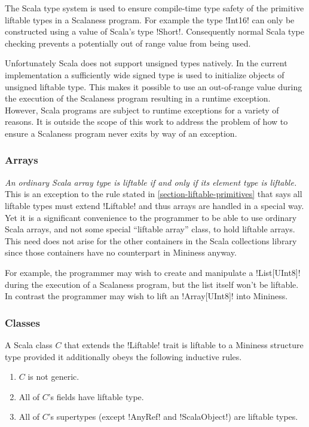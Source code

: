 The Scala type system is used to ensure compile-time type safety of the primitive liftable types
in a Scalaness program. For example the type !Int16! can only be constructed using a value of
Scala's type !Short!. Consequently normal Scala type checking prevents a potentially out of
range value from being used.

Unfortunately Scala does not support unsigned types natively. In the current implementation a
sufficiently wide signed type is used to initialize objects of unsigned liftable type. This
makes it possible to use an out-of-range value during the execution of the Scalaness program
resulting in a runtime exception. However, Scala programs are subject to runtime exceptions for
a variety of reasons. It is outside the scope of this work to address the problem of how to
ensure a Scalaness program never exits by way of an exception.

\subsubsection{Arrays}
\label{section-liftable-arrays}

\emph{An ordinary Scala array type is liftable if and only if its element type is liftable.}
This is an exception to the rule stated in \autoref{section-liftable-primitives} that says all
liftable types must extend !Liftable! and thus arrays are handled in a special way. Yet it is a
significant convenience to the programmer to be able to use ordinary Scala arrays, and not some
special ``liftable array'' class, to hold liftable arrays. This need does not arise for the
other containers in the Scala collections library since those containers have no counterpart in
Mininess anyway.

For example, the programmer may wish to create and manipulate a !List[UInt8]! during the
execution of a Scalaness program, but the list itself won't be liftable. In contrast the
programmer may wish to lift an !Array[UInt8]! into Mininess.

\subsubsection{Classes}
\label{section-liftable-classes}

A Scala class $C$ that extends the !Liftable! trait is liftable to a Mininess structure type
provided it additionally obeys the following inductive rules.

\begin{enumerate}
\item $C$ is not generic.
\item All of $C$'s fields have liftable type.
\item All of $C$'s supertypes (except !AnyRef! and !ScalaObject!) are liftable types.
\end{enumerate}

